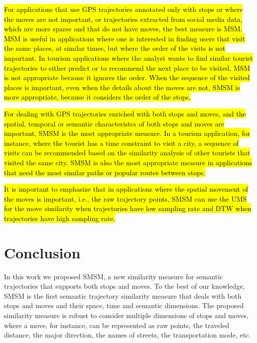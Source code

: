 \documentclass[12pt]{article}
\begin{document}
\hl{For applications that use GPS trajectories annotated only with stops or where the moves are not important, or trajectories extracted from social media data, which are more sparse and that do not have moves, the best measure is MSM. MSM is useful in applications where one is interested in finding users that visit the same places, at similar times, but where the order of the visits is not important. In tourism applications where the analyst wants to find similar tourist trajectories to either predict or to recommend the next place to be visited, MSM is not appropriate because it ignores the order. When the sequence of the visited places is important, even when the details about the moves are not, SMSM is more appropriate, because it considers the order of the stops.}

\hl{For dealing with GPS trajectories enriched with both stops and moves, and the spatial, temporal or semantic characteristcs of both stops and moves are important, SMSM is the most appropriate measure. In a tourism application, for instance, where the tourist has a time constraint to visit a city, a sequence of visits can be recommended based on the similarity analysis of other tourists that visited the same city. SMSM is also the most appropriate measure in applications that need the most similar paths or popular routes between stops.}

\hl{It is important to emphasize that in applications where the spatial movement of the moves is important, i.e., the raw trajectory points, SMSM can use the UMS for the move similarity when trajectories have low sampling rate and DTW when trajectories have high sampling rate.}

\section{Conclusion} \label{sec:conclusions}
In this work we proposed SMSM, a new similarity measure for semantic trajectories that supports both stops and moves.  To the best of our knowledge, SMSM is the first semantic trajectory similarity measure that deals with both stops and moves and their space, time and semantic dimensions. The proposed similarity measure is robust  to consider multiple dimensions of stops and moves, where a move, for instance, can be represented as raw points, the traveled distance, the major direction, the names of streets, the transportation mode, etc.
\end{document}
